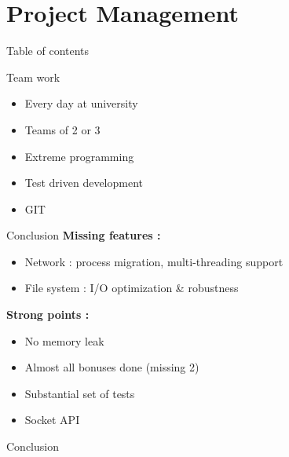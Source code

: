 \documentclass{beamer}
\begin{document}
\section{Project Management}
\begin{frame}{Table of contents}
    \tableofcontents[currentsection]
\end{frame}

\begin{frame}{Team work}
    \begin{itemize}
        \item Every day at university
        \item Teams of 2 or 3
        \item Extreme programming
        \item Test driven development
        \item GIT
    \end{itemize}
\end{frame}

\begin{frame}{Conclusion}
    \textbf{Missing features :}
    \begin{itemize}
        \item Network : process migration, multi-threading support
        \item File system : I/O optimization \& robustness
    \end{itemize}

    \textbf{Strong points :}
    \begin{itemize}
        \item No memory leak
        \item Almost all bonuses done (missing 2)
        \item Substantial set of tests
        \item Socket API
    \end{itemize}
\end{frame}

\begin{frame}{Conclusion}
\end{frame}
\end{document}
